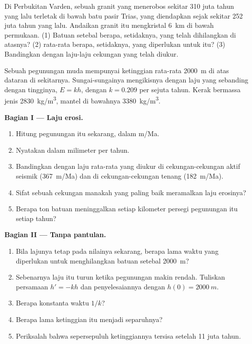 \begin{exercise}[$\star\star\star$]\label{exo:g12:destruction-of-mountains:15}
Di Perbukitan Varden, sebuah granit yang menerobos sekitar 310 juta tahun yang
lalu terletak di bawah batu pasir Trias, yang diendapkan sejak sekitar 252 juta
tahun yang lalu. Andaikan granit itu mengkristal \qty{6}{km} di bawah
permukaan. (1) Batuan setebal berapa, setidaknya, yang telah dihilangkan di
atasnya? (2)  rata-rata berapa, setidaknya, yang diperlukan untuk
itu? (3) Bandingkan dengan laju-laju cekungan yang telah diukur.
\end{exercise}

\begin{problem}
\label{pb:g12:destruction-of-mountains:1}
Sebuah pegunungan muda mempunyai ketinggian rata-rata \qty{2000}{m} di atas
dataran di sekitarnya. Sungai-sungainya mengikisnya dengan laju yang sebanding
dengan tingginya, $E = kh$, dengan $k = 0.209$ per sejuta tahun. Kerak
bermassa jenis \qty{2830}{kg/m^3}, mantel di bawahnya \qty{3380}{kg/m^3}.

\medskip
\noindent\textbf{Bagian I --- Laju erosi.}
\begin{enumerate}
  \item Hitung  pegunungan itu sekarang, dalam \unit{m/Ma}.
  \item Nyatakan dalam milimeter per tahun.
  \item Bandingkan dengan laju rata-rata yang diukur di cekungan-cekungan
        aktif seismik (\qty{367}{m/Ma}) dan di cekungan-cekungan tenang
        (\qty{182}{m/Ma}).
  \item Sifat sebuah cekungan manakah yang paling baik meramalkan laju
        erosinya?
  \item Berapa ton batuan meninggalkan setiap kilometer persegi pegunungan itu
        setiap tahun?
\end{enumerate}

\medskip
\noindent\textbf{Bagian II --- Tanpa pantulan.}
\begin{enumerate}[resume]
  \item Bila lajunya tetap pada nilainya sekarang, berapa lama waktu yang
        diperlukan untuk menghilangkan batuan setebal \qty{2000}{m}?
  \item Sebenarnya laju itu turun ketika pegunungan makin rendah. Tuliskan
        persamaan $h' = -kh$ dan penyelesaiannya dengan $h(0) = \qty{2000}{m}$.
  \item Berapa konstanta waktu $1/k$?
  \item Berapa lama ketinggian itu menjadi separuhnya?
  \item Periksalah bahwa sepersepuluh ketinggiannya tersisa setelah 11 juta
        tahun.
\end{enumerate}


\end{problem}
